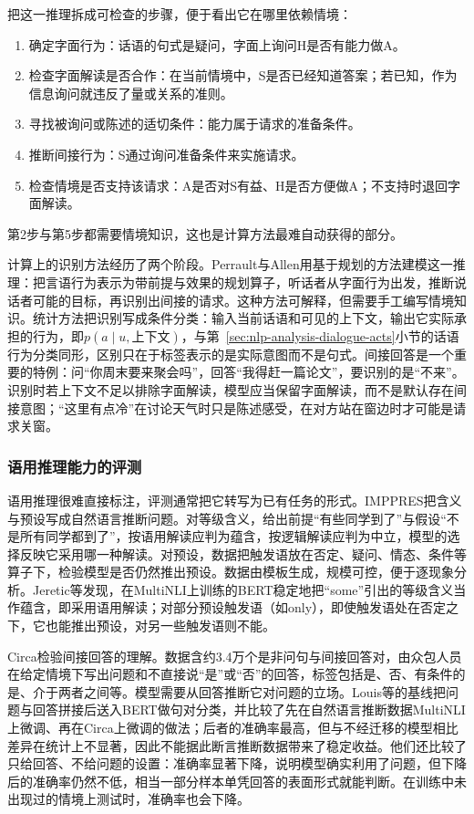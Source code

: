 把这一推理拆成可检查的步骤，便于看出它在哪里依赖情境：
\begin{enumerate}
  \item 确定字面行为：话语的句式是疑问，字面上询问H是否有能力做A。
  \item 检查字面解读是否合作：在当前情境中，S是否已经知道答案；若已知，作为信息询问就违反了量或关系的准则。
  \item 寻找被询问或陈述的适切条件：能力属于请求的准备条件。
  \item 推断间接行为：S通过询问准备条件来实施请求。
  \item 检查情境是否支持该请求：A是否对S有益、H是否方便做A；不支持时退回字面解读。
\end{enumerate}
第2步与第5步都需要情境知识，这也是计算方法最难自动获得的部分。

计算上的识别方法经历了两个阶段。Perrault与Allen用基于规划的方法建模这一推理：把言语行为表示为带前提与效果的规划算子，听话者从字面行为出发，推断说话者可能的目标，再识别出间接的请求。这种方法可解释，但需要手工编写情境知识。统计方法把识别写成条件分类：输入当前话语和可见的上下文，输出它实际承担的行为，即$p(a\mid u,\text{上下文})$，与第~\ref{sec:nlp-analysis-dialogue-acts}小节的话语行为分类同形，区别只在于标签表示的是实际意图而不是句式。间接回答是一个重要的特例：问“你周末要来聚会吗”，回答“我得赶一篇论文”，要识别的是“不来”。识别时若上下文不足以排除字面解读，模型应当保留字面解读，而不是默认存在间接意图；“这里有点冷”在讨论天气时只是陈述感受，在对方站在窗边时才可能是请求关窗。

\subsubsection{语用推理能力的评测}
\label{sec:nlp-analysis-pragmatic-eval}

语用推理很难直接标注，评测通常把它转写为已有任务的形式。IMPPRES把含义与预设写成自然语言推断问题。对等级含义，给出前提“有些同学到了”与假设“不是所有同学都到了”，按语用解读应判为蕴含，按逻辑解读应判为中立，模型的选择反映它采用哪一种解读。对预设，数据把触发语放在否定、疑问、情态、条件等算子下，检验模型是否仍然推出预设。数据由模板生成，规模可控，便于逐现象分析。Jeretic等发现，在MultiNLI上训练的BERT稳定地把“some”引出的等级含义当作蕴含，即采用语用解读；对部分预设触发语（如only），即使触发语处在否定之下，它也能推出预设，对另一些触发语则不能。

Circa检验间接回答的理解。数据含约3.4万个是非问句与间接回答对，由众包人员在给定情境下写出问题和不直接说“是”或“否”的回答，标签包括是、否、有条件的是、介于两者之间等。模型需要从回答推断它对问题的立场。Louis等的基线把问题与回答拼接后送入BERT做句对分类，并比较了先在自然语言推断数据MultiNLI上微调、再在Circa上微调的做法；后者的准确率最高，但与不经迁移的模型相比差异在统计上不显著，因此不能据此断言推断数据带来了稳定收益。他们还比较了只给回答、不给问题的设置：准确率显著下降，说明模型确实利用了问题，但下降后的准确率仍然不低，相当一部分样本单凭回答的表面形式就能判断。在训练中未出现过的情境上测试时，准确率也会下降。

